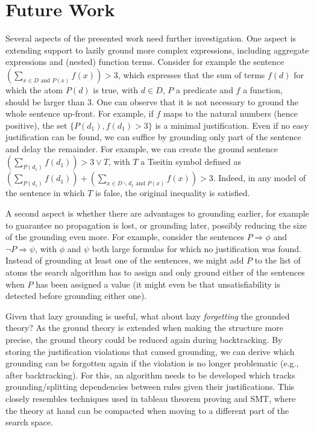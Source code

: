 \documentclass[11pt]{article}
\newcommand{\m}[1]{\ensuremath{#1}\xspace}
\newcommand{\limplies}{\m{\Rightarrow}}
\newcommand{\elim}{\m{\backslash}}
\theoremstyle{plain}
\theoremstyle{definition}
\theoremstyle{example_basic}
\theoremstyle{example_contd}
\theoremstyle{plain}
\newcommand{\change}[1]{#1}
\begin{document}
\section{Future Work}
\change{Several aspects of the presented work need further
  investigation.}
One aspect is extending support to lazily ground more complex expressions, including aggregate expressions and (nested) function terms. Consider for example the sentence $(\sum_{x\in D \text{ and } P(x)}f(x))>3$, which expresses that the sum of terms $f(d)$ for which the atom $P(d)$ is true, with $d\in D$, $P$ a predicate and $f$ a function, should be larger than 3. One can observe that it is not necessary to ground the whole sentence up-front. For example, if $f$ maps to the natural numbers (hence positive), the set $\{P(d_1), f(d_1)>3\}$ is a minimal justification. Even if no easy justification can be found, we can suffice by grounding only part of the sentence and delay the remainder. For example, we can create the ground sentence $(\sum_{P(d_1)}f(d_1)) > 3 \lor T$, with $T$ a Tseitin symbol defined as $(\sum_{P(d_1)} f(d_1)) + (\sum_{x\in D \elim d_1 \text{ and } P(x)}f(x))>3$. Indeed, in any model of the sentence in which $T$ is false, the original inequality is satisfied.

A second aspect is whether there are advantages to grounding earlier, for example to guarantee no propagation is lost, or grounding later, possibly reducing the size of the grounding even more. For example, consider the sentences $P \limplies \phi$ and $\lnot P \limplies \psi$, with $\phi$ and $\psi$ both large formulas for which no justification was found. Instead of grounding at least one of the sentences, we might add $P$ to the list of atoms the search algorithm has to assign and only ground either of the sentences when $P$ has been assigned a value (it might even be that unsatisfiability is detected before grounding either one).

Given that lazy grounding is useful, what about lazy \emph{forgetting}  the grounded theory? As the ground theory is extended when making the structure more precise, the ground theory could be reduced again during backtracking. By storing the justification violations that caused grounding, we can derive which grounding can be forgotten again if the violation is no longer problematic (e.g., after backtracking). For this, an algorithm needs to be developed which tracks grounding/splitting dependencies between rules given their justifications. This closely resembles techniques used in tableau theorem proving and SMT, where the theory at hand can be compacted when moving to a different part of the search space.
\end{document}
